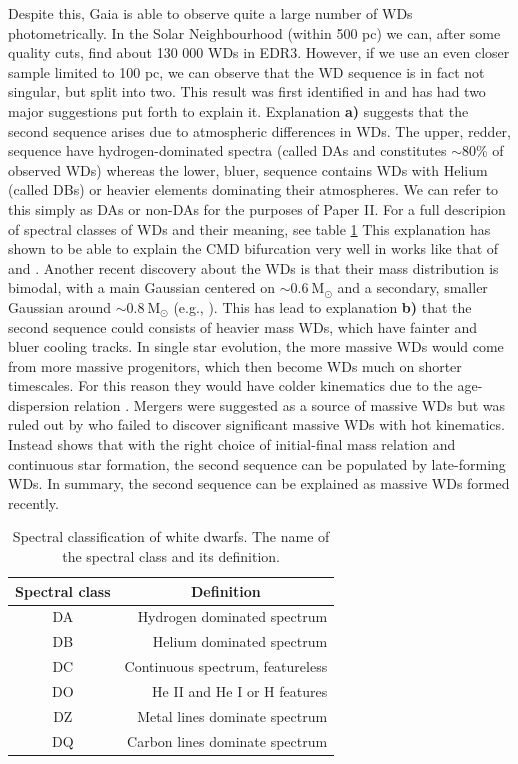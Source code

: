 Despite this, Gaia is able to observe quite a large number of WDs photometrically. In the Solar Neighbourhood (within 500 pc) we can, after some quality cuts, find about 130 000 WDs in EDR3. However, if we use an even closer sample limited to 100 pc, we can observe that the WD sequence is in fact not singular, but split into two. This result was first identified in \cite{dr2:hr} and has had two major suggestions put forth to explain it. Explanation \textbf{a)} suggests that the second sequence arises due to atmospheric differences in WDs. The upper, redder, sequence have hydrogen-dominated spectra (called DAs and constitutes {$\sim$}80\% of observed WDs) whereas the lower, bluer, sequence contains WDs with Helium (called DBs) or heavier elements dominating their atmospheres. We can refer to this simply as DAs or non-DAs for the purposes of Paper II. For a full descripion of spectral classes of WDs and their meaning, see table \ref{tab:p2-wds} This explanation has shown to be able to explain the CMD bifurcation very well in works like that of \cite{kilic:18, kilic:20} and \cite{gentile-fusilo:19}. Another recent discovery about the WDs is that their mass distribution is bimodal, with a main Gaussian centered on ${\sim}0.6\ \mathrm{M}_\odot$ and a secondary, smaller Gaussian around ${\sim}0.8\ \mathrm{M}_\odot$ (e.g., \citealt{elbadry:18, kilic:18, kilic:20}). This has lead to explanation \textbf{b)} that the second sequence could consists of heavier mass WDs, which have fainter and bluer cooling tracks. In single star evolution, the more massive WDs would come from more massive progenitors, which then become WDs much on shorter timescales. For this reason they would have colder kinematics due to the age-dispersion relation \citep{aumer:16}. Mergers were suggested as a source of massive WDs but was ruled out by \cite{kilic:20} who failed to discover significant massive WDs with hot kinematics. Instead \cite{elbadry:18} shows that with the right choice of initial-final mass relation and continuous star formation, the second sequence can be populated by late-forming WDs. In summary, the second sequence can be explained as massive WDs formed recently. 
\begin{table}[t!]
\caption{Spectral classification of white dwarfs. The name of the spectral class and its definition.}\label{tab:p2-wds}
\begin{tabular}{|c|r|}
\hline
\textbf{Spectral class} & \multicolumn{1}{c|}{\textbf{Definition}} \\ \hline
DA & Hydrogen dominated spectrum \\
DB & Helium dominated spectrum \\
DC & Continuous spectrum, featureless \\
DO & He II and He I or H features \\
DZ & Metal lines dominate spectrum \\
DQ & Carbon lines dominate spectrum \\\hline
\end{tabular}
\end{table}
